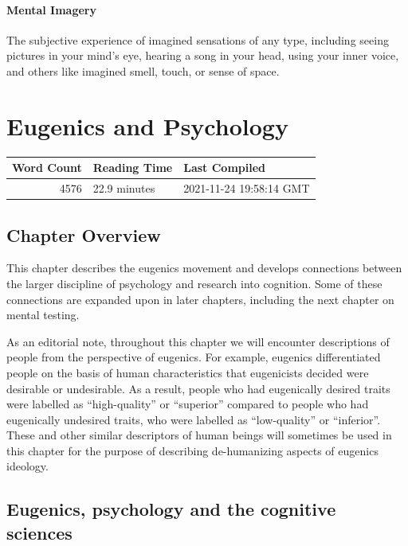 \documentclass[
  oneside,
  12pt]{crumpbook}
\begin{document}
\hypertarget{gls-mentalimagery}{%
\subsubsection*{Mental Imagery}\label{gls-mentalimagery}}

The subjective experience of imagined sensations of any type, including seeing pictures in your mind's eye, hearing a song in your head, using your inner voice, and others like imagined smell, touch, or sense of space.

\hypertarget{eugenics-and-psychology}{%
\chapter{Eugenics and Psychology}\label{eugenics-and-psychology}}

\begin{tabular}{r|l|l}
\hline
Word Count & Reading Time & Last Compiled\\
\hline
4576 & 22.9 minutes & 2021-11-24 19:58:14 GMT\\
\hline
\end{tabular}

\hypertarget{chapter-overview-2}{%
\section{Chapter Overview}\label{chapter-overview-2}}

This chapter describes the eugenics movement and develops connections between the larger discipline of psychology and research into cognition. Some of these connections are expanded upon in later chapters, including the next chapter on mental testing.

As an editorial note, throughout this chapter we will encounter descriptions of people from the perspective of eugenics. For example, eugenics differentiated people on the basis of human characteristics that eugenicists decided were desirable or undesirable. As a result, people who had eugenically desired traits were labelled as ``high-quality'' or ``superior'' compared to people who had eugenically undesired traits, who were labelled as ``low-quality'' or ``inferior''. These and other similar descriptors of human beings will sometimes be used in this chapter for the purpose of describing de-humanizing aspects of eugenics ideology.

\hypertarget{eugenics-psychology-and-the-cognitive-sciences}{%
\section{Eugenics, psychology and the cognitive sciences}\label{eugenics-psychology-and-the-cognitive-sciences}}
\end{document}
